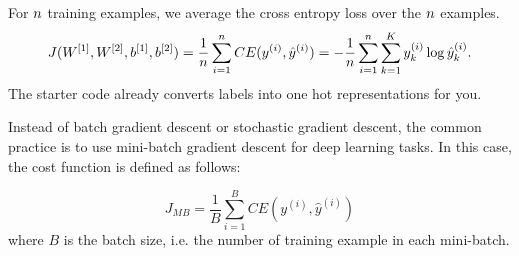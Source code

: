 For ${n}$ training examples, we average the cross entropy loss over the ${n}$ examples.
  \begin{equation*}
  J(W^{[1]},W^{[2]},b^{[1]},b^{[2]}) = \frac{1}{{n}}\sum_{i=1}^{n} CE(y^{(i)}, \hat{y}^{(i)}) = - \frac{1}{{n}}\sum_{i=1}^{n} \sum_{k=1}^K y_k^{(i)} \log \hat{y}_k^{(i)}.
  \end{equation*}
The starter code already converts labels into one hot representations for you.

Instead of batch gradient descent or stochastic gradient descent, the common practice
is to use mini-batch gradient descent for deep learning tasks. In this case, the
cost function is defined as follows:

  \begin{equation*}
  J_{MB} = \frac{1}{B}\sum_{i=1}^{B}CE(y^{(i)}, \hat{y}^{(i)})
  \end{equation*}
where $B$ is the batch size, i.e. the number of training example in each mini-batch. 

\begin{enumerate}
  

\ifnum{} {
  
} \fi

  

\ifnum{} {
  
} \fi


  
\ifnum{} {
  
} \fi

 \end{enumerate}

